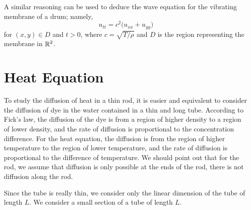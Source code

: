 A similar reasoning can be used to deduce the wave equation for the
vibrating membrane of a drum; namely,
\[
u_{tt} = c^2 \big( u_{xx} + u_{yy} \big)
\]
for $(x,y) \in D$ and $t > 0$,  where $c = \sqrt{T/\rho}$ and $D$ is
the region representing the membrane in $\displaystyle \mathbb{R}^2$.

\section*{Heat Equation}

To study the diffusion of heat in a thin rod, it is easier and
equivalent to consider the diffusion of dye in the water contained in a
thin and long tube.  According to Fick's law, the diffusion of the dye
is from a region of higher density to a region of lower density, and
the rate of diffusion is proportional to the concentration difference.
For the heat equation, the diffusion is from the region of higher
temperature to the region of lower temperature, and the rate of
diffusion is proportional to the difference of temperature.
We should point out that for the rod, we assume that diffusion is only
possible at the ends of the rod, there is not diffusion along the rod.

Since the tube is really thin, we consider only the linear dimension
of the tube of length $L$.  We consider a small section of a tube of
length $L$.


